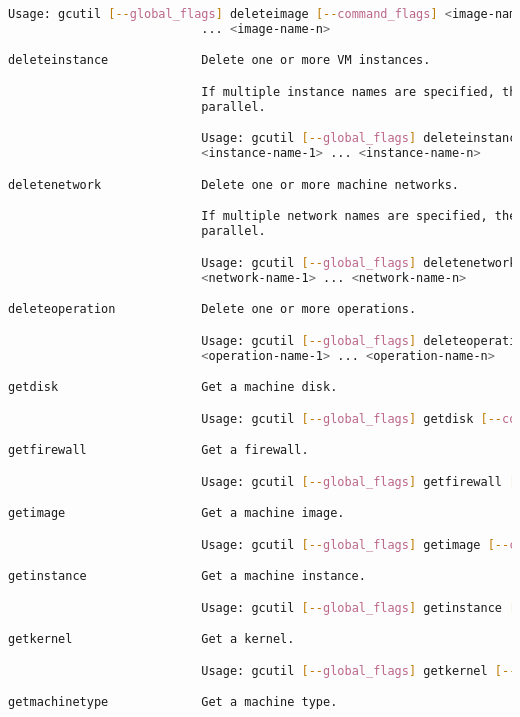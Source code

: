 \begin{lstlisting}[language=Bash]
                           Usage: gcutil [--global_flags] deleteimage [--command_flags] <image-name-1>
                           ... <image-name-n>

deleteinstance             Delete one or more VM instances.

                           If multiple instance names are specified, the instances will be deleted in
                           parallel.

                           Usage: gcutil [--global_flags] deleteinstance [--command_flags]
                           <instance-name-1> ... <instance-name-n>

deletenetwork              Delete one or more machine networks.

                           If multiple network names are specified, the networks will be deleted in
                           parallel.

                           Usage: gcutil [--global_flags] deletenetwork [--command_flags]
                           <network-name-1> ... <network-name-n>

deleteoperation            Delete one or more operations.

                           Usage: gcutil [--global_flags] deleteoperation [--command_flags]
                           <operation-name-1> ... <operation-name-n>

getdisk                    Get a machine disk.

                           Usage: gcutil [--global_flags] getdisk [--command_flags] <disk-name>

getfirewall                Get a firewall.

                           Usage: gcutil [--global_flags] getfirewall [--command_flags] <firewall-name>

getimage                   Get a machine image.

                           Usage: gcutil [--global_flags] getimage [--command_flags] <image-name>

getinstance                Get a machine instance.

                           Usage: gcutil [--global_flags] getinstance [--command_flags] <instance-name>

getkernel                  Get a kernel.

                           Usage: gcutil [--global_flags] getkernel [--command_flags]

getmachinetype             Get a machine type.


\end{lstlisting}
